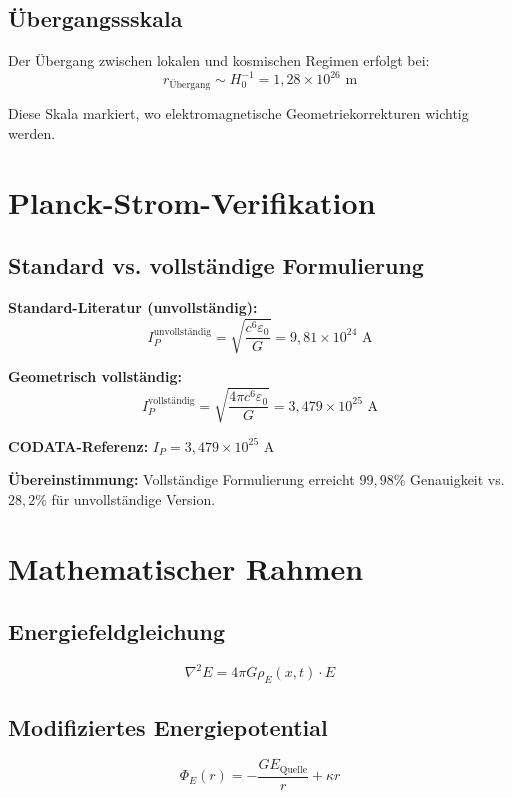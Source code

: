 \documentclass[12pt,a4paper]{article}
\begin{document}
	\subsection{Übergangssskala}
	Der Übergang zwischen lokalen und kosmischen Regimen erfolgt bei:
	\begin{equation}
		r_{\text{Übergang}} \sim H_0^{-1} = 1{,}28 \times 10^{26} \text{ m}
	\end{equation}
	
	Diese Skala markiert, wo elektromagnetische Geometriekorrekturen wichtig werden.
	
	\section{Planck-Strom-Verifikation}
	
	\subsection{Standard vs. vollständige Formulierung}
	\textbf{Standard-Literatur (unvollständig):}
	\begin{equation}
		I_P^{\text{unvollständig}} = \sqrt{\frac{c^6\varepsilon_0}{G}} = 9{,}81 \times 10^{24} \text{ A}
	\end{equation}
	
	\textbf{Geometrisch vollständig:}
	\begin{equation}
		I_P^{\text{vollständig}} = \sqrt{\frac{4\pi c^6\varepsilon_0}{G}} = 3{,}479 \times 10^{25} \text{ A}
	\end{equation}
	
	\textbf{CODATA-Referenz:} $I_P = 3{,}479 \times 10^{25}$ A
	
	\textbf{Übereinstimmung:} Vollständige Formulierung erreicht $99{,}98\%$ Genauigkeit vs. $28{,}2\%$ für unvollständige Version.
	
	\section{Mathematischer Rahmen}
	
	\subsection{Energiefeldgleichung}
	\begin{equation}
		\nabla^2 E = 4\pi G \rho_E(x,t) \cdot E
	\end{equation}
	
	\subsection{Modifiziertes Energiepotential}
	\begin{equation}
		\Phi_E(r) = -\frac{GE_{\text{Quelle}}}{r} + \kappa r
	\end{equation}
	
\end{document}
